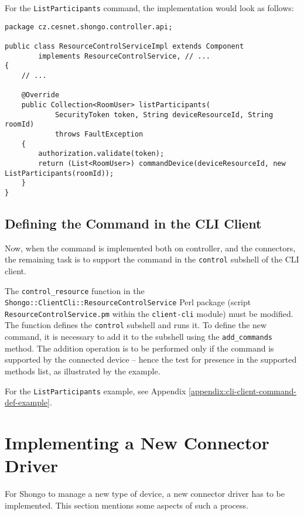 \bigskip

For the \texttt{ListParticipants} command, the implementation would look as follows:

{ \small
\begin{verbatim}
package cz.cesnet.shongo.controller.api;

public class ResourceControlServiceImpl extends Component
        implements ResourceControlService, // ...
{
    // ...

    @Override
    public Collection<RoomUser> listParticipants(
            SecurityToken token, String deviceResourceId, String roomId)
            throws FaultException
    {
        authorization.validate(token);
        return (List<RoomUser>) commandDevice(deviceResourceId, new ListParticipants(roomId));
    }
}
\end{verbatim}
}


\subsection{Defining the Command in the CLI Client}

Now, when the command is implemented both on controller, and the connectors, the remaining task is to support the command in the \texttt{control} subshell of the CLI client.

The \texttt{control\_resource} function in the \texttt{Shongo::ClientCli::ResourceControlService} Perl package (script \texttt{ResourceControlService.pm} within the \texttt{client-cli} module) must be modified. The function defines the \texttt{control} subshell and runs it. To define the new command, it is necessary to add it to the subshell using the \texttt{add\_commands} method. The addition operation is to be performed only if the command is supported by the connected device -- hence the test for presence in the supported methods list, as illustrated by the example.

\bigskip

For the \texttt{ListParticipants} example, see Appendix \ref{appendix:cli-client-command-def-example}.


\section{Implementing a New Connector Driver}

For Shongo to manage a new type of device, a new connector driver has to be implemented. This section mentions some aspects of such a process.

